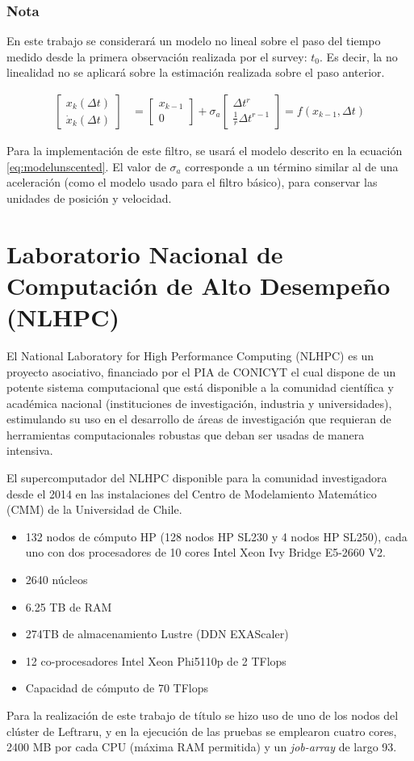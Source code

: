 \subsubsection{Nota}
En este trabajo se considerar\'a un modelo no lineal sobre el paso del tiempo medido desde la primera observaci\'on realizada por el survey: $t_0$. Es decir, la no linealidad no se aplicar\'a sobre la estimaci\'on realizada sobre el paso anterior.

\begin{align}
\begin{bmatrix}
x_k(\Delta t)\\
\dot{x}_k(\Delta t)
\end{bmatrix}  &= \begin{bmatrix}
x_{k-1}\\
0
\end{bmatrix} + \sigma_a\begin{bmatrix}
\Delta t ^{r}\\
\frac{1}{r}\Delta t^{r-1}
\end{bmatrix} = f(x_{k-1}, \Delta t)
\label{eq:modelunscented}
\end{align}

Para la implementaci\'on de este filtro, se usar\'a el modelo descrito en la ecuaci\'on \ref{eq:modelunscented}. El valor de $\sigma_a$ corresponde a un t\'ermino similar al de una aceleraci\'on (como el modelo usado para el filtro b\'asico), para conservar las unidades de posici\'on y velocidad.

\section{Laboratorio Nacional de Computaci\'on de Alto Desempe\~no (NLHPC)}
El National Laboratory for High Performance Computing (NLHPC) es un proyecto asociativo, financiado por el PIA de CONICYT el cual dispone de un potente sistema computacional que est\'a disponible a la comunidad cient\'ifica y acad\'emica nacional (instituciones de investigaci\'on, industria y universidades), estimulando su uso en el desarrollo de \'areas de investigaci\'on que requieran de herramientas computacionales robustas que deban ser usadas de manera intensiva. 
\bigskip

El supercomputador del NLHPC disponible para la comunidad investigadora desde el 2014 en las instalaciones del Centro de Modelamiento Matem\'atico (CMM) de la Universidad de Chile.  

\begin{itemize}
\item 132 nodos de c\'omputo HP (128 nodos HP SL230 y 4 nodos HP SL250), cada uno con dos procesadores de 10 cores Intel Xeon Ivy Bridge E5-2660 V2.
\item 2640 n\'ucleos
\item 6.25 TB de RAM
\item 274TB de almacenamiento Lustre (DDN EXAScaler)
\item 12 co-procesadores Intel Xeon Phi5110p de 2 TFlops
\item Capacidad de c\'omputo de 70 TFlops 
\end{itemize} 

Para la realizaci\'on de este trabajo de t\'itulo se hizo uso de uno de los nodos del cl\'uster de Leftraru, y en la ejecuci\'on de las pruebas se emplearon cuatro cores, 2400 MB por cada CPU (m\'axima RAM permitida) y un \textit{job-array} de largo 93.

